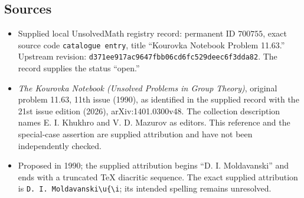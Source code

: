 \documentclass[11pt]{article}
\begin{document}
\subsection{Sources}
\begin{itemize}
\item Supplied local UnsolvedMath registry record: permanent ID \(700755\), exact source code \texttt{catalogue entry}, title ``Kourovka Notebook Problem 11.63.'' Upstream revision: \texttt{d371ee917ac9647fbb06cd6fc529deec6f3dda82}. The record supplies the status ``open.''
\item \emph{The Kourovka Notebook (Unsolved Problems in Group Theory)}, original problem 11.63, 11th issue (1990), as identified in the supplied record with the 21st issue edition (2026), arXiv:1401.0300v48. The collection description names E. I. Khukhro and V. D. Mazurov as editors. This reference and the special-case assertion are supplied attribution and have not been independently checked.
\item Proposed in 1990; the supplied attribution begins ``D. I. Moldavanski'' and ends with a truncated TeX diacritic sequence. The exact supplied attribution is \texttt{D. I. Moldavanski\textbackslash{}u\{\textbackslash{}i}; its intended spelling remains unresolved.
\end{itemize}
\end{document}

